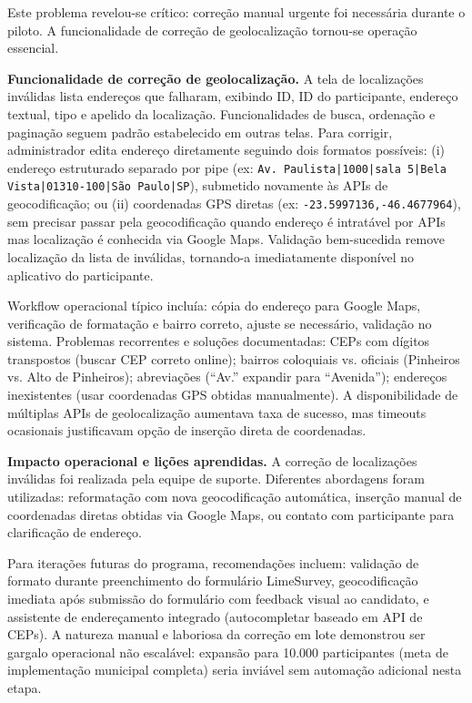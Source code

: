 Este problema revelou-se crítico: correção manual urgente foi necessária durante o piloto. A funcionalidade de correção de geolocalização tornou-se operação essencial.

\textbf{Funcionalidade de correção de geolocalização.} A tela de localizações inválidas lista endereços que falharam, exibindo ID, ID do participante, endereço textual, tipo e apelido da localização. Funcionalidades de busca, ordenação e paginação seguem padrão estabelecido em outras telas. Para corrigir, administrador edita endereço diretamente seguindo dois formatos possíveis: (i) endereço estruturado separado por pipe (ex: \texttt{Av. Paulista|1000|sala 5|Bela Vista|01310-100|São Paulo|SP}), submetido novamente às APIs de geocodificação; ou (ii) coordenadas GPS diretas (ex: \texttt{-23.5997136,-46.4677964}), sem precisar passar pela geocodificação quando endereço é intratável por APIs mas localização é conhecida via Google Maps. Validação bem-sucedida remove localização da lista de inválidas, tornando-a imediatamente disponível no aplicativo do participante.

Workflow operacional típico incluía: cópia do endereço para Google Maps, verificação de formatação e bairro correto, ajuste se necessário, validação no sistema. Problemas recorrentes e soluções documentadas: CEPs com dígitos transpostos (buscar CEP correto online); bairros coloquiais vs. oficiais (Pinheiros vs. Alto de Pinheiros); abreviações (``Av.'' expandir para ``Avenida''); endereços inexistentes (usar coordenadas GPS obtidas manualmente). A disponibilidade de múltiplas APIs de geolocalização aumentava taxa de sucesso, mas timeouts ocasionais justificavam opção de inserção direta de coordenadas.

\textbf{Impacto operacional e lições aprendidas.} A correção de localizações inválidas foi realizada pela equipe de suporte. Diferentes abordagens foram utilizadas: reformatação com nova geocodificação automática, inserção manual de coordenadas diretas obtidas via Google Maps, ou contato com participante para clarificação de endereço.

Para iterações futuras do programa, recomendações incluem: validação de formato durante preenchimento do formulário LimeSurvey, geocodificação imediata após submissão do formulário com feedback visual ao candidato, e assistente de endereçamento integrado (autocompletar baseado em API de CEPs). A natureza manual e laboriosa da correção em lote demonstrou ser gargalo operacional não escalável: expansão para 10.000 participantes (meta de implementação municipal completa) seria inviável sem automação adicional nesta etapa.


